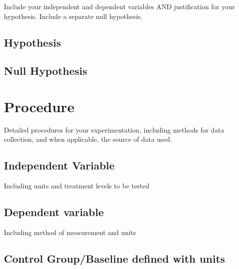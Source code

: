 Include your independent and dependent variables AND justification for your hypothesis. Include a separate null hypothesis.

\subsection*{Hypothesis}

\begin{field}
\end{field}

\subsection*{Null Hypothesis}

\begin{field}
\end{field}

\section{Procedure}

Detailed procedures for your experimentation, including methods for data
collection, and when applicable, the source of data used.

\subsection{Independent Variable}
Including units and treatment levels to be tested

\begin{field}

\end{field}

\subsection{Dependent variable}
Including method of measurement and units

\begin{field}
   
\end{field}


\subsection{Control Group/Baseline defined with units}

\begin{field}

\end{field}

